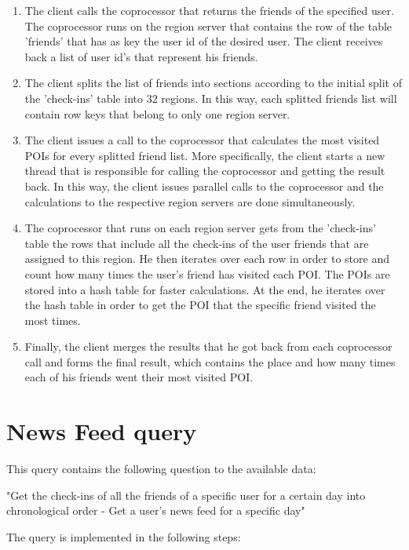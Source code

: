 \begin{enumerate}
 \item The client calls the coprocessor that returns the friends of the specified user. The coprocessor runs on the region server that contains 
 the row of the table 'friends' that has as key the user id of the desired user. The client receives back a list of user id's that 
 represent his friends.
 \item The client splits the list of friends into sections according to the initial split of the 'check-ins' table into 32 regions. In this way, 
 each splitted friends list will contain row keys that belong to only one region server.
 \item The client issues a call to the coprocessor that calculates the most visited POIs for every splitted friend list. 
 More specifically, the client starts a new thread that is responsible for calling the coprocessor and getting the result back. 
 In this way, the client issues parallel calls to the coprocessor and the calculations to the respective region servers are done simultaneously.
 \item The coprocessor that runs on each region server gets from the 'check-ins' table the rows that include all the check-ins of the user friends 
 that are assigned to this region. He then iterates over each row in order to store and count how many times the user's friend has visited each POI. 
 The POIs are stored into a hash table for faster calculations. At the end, he iterates over the hash table in order to get the POI that the 
 specific friend visited the most times.
 \item Finally, the client merges the results that he got back from each coprocessor call and forms the final result, which contains the place and how many times 
 each of his friends went their most visited POI.
\end{enumerate}

\section{News Feed query}

This query contains the following question to the available data:
\begin{center}
 "Get the check-ins of all the friends of a specific user for a certain day into chronological order - Get a user's news feed for a specific day"
\end{center}

The query is implemented in the following steps:

